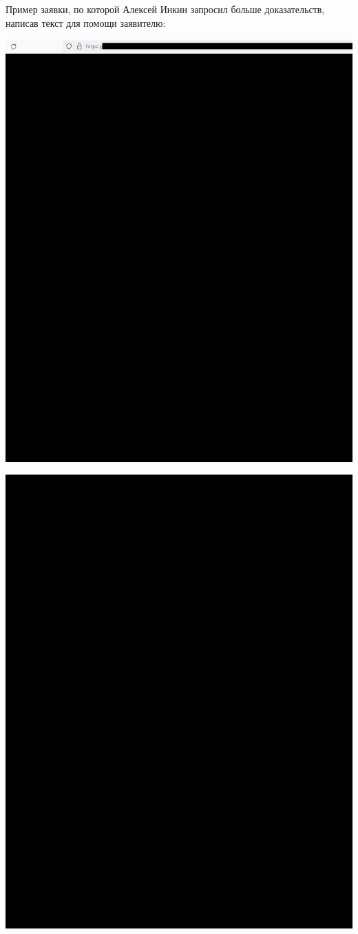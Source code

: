 Пример заявки, по которой Алексей Инкин запросил больше доказательств,
написав текст для помощи заявителю:

\begin{center}
    \includegraphics[width=40em]{rfe-p1_public}
\end{center}
\WillContinue
\pagebreak

\Continuing
\begin{center}
    \includegraphics[width=40em]{rfe-p2_public}
\end{center}

\pagebreak
